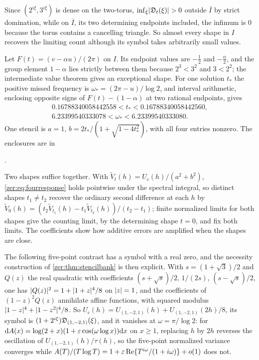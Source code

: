 Since $(2^{i\xi},3^{i\xi})$ is dense on the two-torus, $\inf_\xi\lvert\mathfrak{D}_t(\xi)\rvert>0$ outside $\overline I$ by
strict domination, while on $\overline I$, its two determining endpoints included, the infimum is $0$
because the torus contains a cancelling triangle. So almost every shape in $I$ recovers the
limiting count although its symbol takes arbitrarily small values.

\begin{example}\label{zer:ex:fourexceptional}
Let $F(t)=(v-\alpha u)/(2\pi)$ on $I$. Its endpoint values are $-\tfrac12$ and $-\tfrac\alpha2$, and the group
element $1-\alpha$ lies strictly between them because $2^3<3^2$ and $3<2^2$; the intermediate value
theorem gives an exceptional shape. For one solution $t_*$ the positive missed frequency is
$\omega_*=(2\pi-u)/\log2$, and interval arithmetic, enclosing opposite signs of $F(t)-(1-\alpha)$ at two
rational endpoints, gives
\begin{gather*}
 0.16788340058442558<t_*<0.16788340058442560,\\
 6.23399540333078<\omega_*<6.23399540333080 .
\end{gather*}
One stencil is $a=1$, $b=2t_*/(1+\sqrt{1-4t_*^2})$, with all four entries nonzero. The enclosures are in
\begin{center}.\end{center}
\end{example}

Two shapes suffice together. With $\widetilde V_t(h)=U_c(h)/(a^2+b^2)$, \eqref{zer:eq:fourresponse} holds
pointwise under the spectral integral, so distinct shapes $t_1\ne t_2$ recover the ordinary second
difference at each $h$ by $\widetilde V_0(h)=(t_2\widetilde V_{t_1}(h)-t_1\widetilde V_{t_2}(h))/(t_2-t_1)$; finite
normalized limits for both shapes give the counting limit, by the determining shape $t=0$, and fix both
limits. The coefficients show how additive errors are amplified when the shapes are close.

The following five-point contrast has a symbol with a real zero, and the necessity
construction of \cref{zer:thm:stencilbank} is then explicit. With $s=(1+\sqrt3)/2$ and $Q(z)$ the real
quadratic with coefficients $(s+\sqrt s)/2$, $1/(2s)$, $(s-\sqrt s)/2$, one has
$\lvert Q(z)\rvert^2=1+\lvert1+z\rvert^4/8$ on $\lvert z\rvert=1$, and the coefficients of $(1-z)^2Q(z)$ annihilate affine
functions, with squared modulus $\lvert1-z\rvert^4+\lvert1-z^2\rvert^4/8$. So $U_c(h)=U_{(1,-2,1)}(h)+U_{(1,-2,1)}(2h)/8$, its
symbol is $(1+2^{i\xi})\mathfrak{D}_{(1,-2,1)}(\xi)$, and it vanishes at $\omega=\pi/\log2$: for
$\mathrm{d} A(x)=\log(2+x)(1+\varepsilon\cos(\omega\log x))\mathrm{d} x$ on $x\ge1$, replacing $h$ by $2h$ reverses the
oscillation of $U_{(1,-2,1)}(h)/\tau(h)$, so the five-point normalized variance converges while
$A(T)/(T\log T)=1+\varepsilon\operatorname{Re}\{T^{i\omega}/(1+i\omega)\}+o(1)$ does not.

